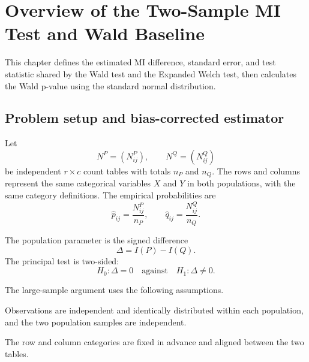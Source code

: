 \chapter{Overview of the Two-Sample MI Test and Wald Baseline}
\label{chap:baselines}

This chapter defines the estimated MI difference, standard error, and test
statistic shared by the Wald test and the Expanded Welch test, then calculates the
Wald p-value using the standard normal distribution.

\section{Problem setup and bias-corrected estimator}

Let
\begin{equation}
  N^P=(N^P_{ij}),
  \qquad
  N^Q=(N^Q_{ij})
\end{equation}
be independent \(r\times c\) count tables with totals \(n_P\) and \(n_Q\).
The rows and columns represent the same categorical variables \(X\) and
\(Y\) in both populations, with the same category definitions.
The empirical probabilities are
\begin{equation}
  \widehat p_{ij}=\frac{N^P_{ij}}{n_P},
  \qquad
  \widehat q_{ij}=\frac{N^Q_{ij}}{n_Q}.
\end{equation}

The population parameter is the signed difference
\begin{equation}
  \Delta=I(P)-I(Q).
  \label{eq:delta-population}
\end{equation}
The principal test is two-sided:
\begin{equation}
  H_0:\Delta=0
  \quad\text{against}\quad
  H_1:\Delta\ne0.
  \label{eq:two-sample-null}
\end{equation}

The large-sample argument uses the following assumptions.

\begin{samepage}
\begin{assumption}[Sampling]
Observations are independent and identically distributed within each
population, and the two population samples are independent.
\end{assumption}
\end{samepage}

\begin{assumption}
The row and column categories are fixed in advance and aligned between the two
tables.
\end{assumption}


